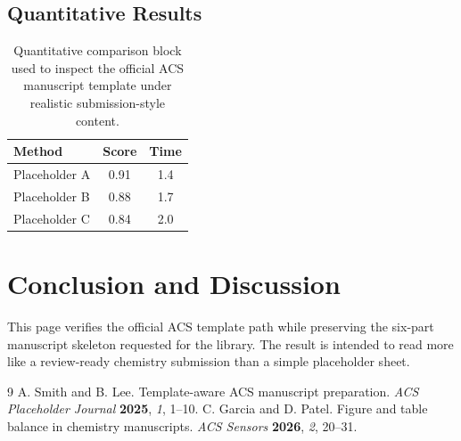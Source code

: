 \documentclass[manuscript=article]{achemso}
\begin{document}
\subsection{Quantitative Results}
\begin{table}[ht]
\caption{Quantitative comparison block used to inspect the official ACS manuscript template under realistic submission-style content.}
\centering
\begin{tabular}{lcc}
\toprule
Method & Score & Time \\
\midrule
Placeholder A & 0.91 & 1.4 \\
Placeholder B & 0.88 & 1.7 \\
Placeholder C & 0.84 & 2.0 \\
\bottomrule
\end{tabular}
\end{table}
\section{Conclusion and Discussion}
This page verifies the official ACS template path while preserving the six-part manuscript skeleton requested for the library. The result is intended to read more like a review-ready chemistry submission than a simple placeholder sheet.
\begin{thebibliography}{9}
 A. Smith and B. Lee. Template-aware ACS manuscript preparation. \textit{ACS Placeholder Journal} \textbf{2025}, \textit{1}, 1--10.
 C. Garcia and D. Patel. Figure and table balance in chemistry manuscripts. \textit{ACS Sensors} \textbf{2026}, \textit{2}, 20--31.
\end{thebibliography}
\end{document}
